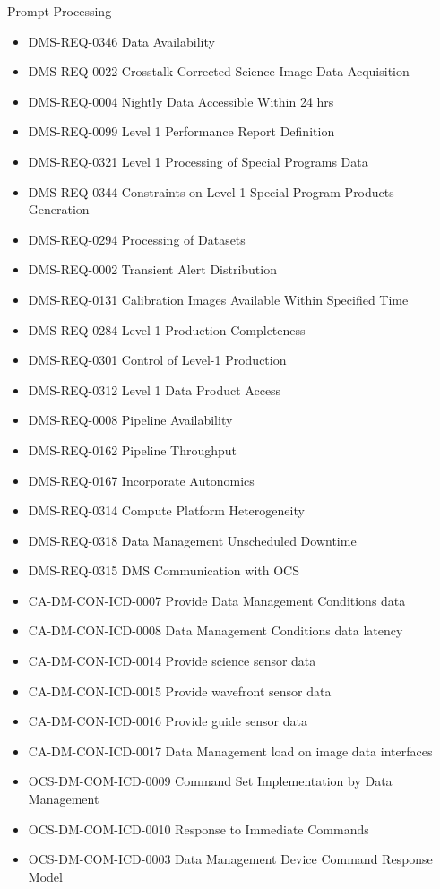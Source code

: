 Prompt Processing \begin{itemize}
\item DMS-REQ-0346 Data Availability
\item DMS-REQ-0022 Crosstalk Corrected Science Image Data Acquisition
\item DMS-REQ-0004 Nightly Data Accessible Within 24 hrs
\item DMS-REQ-0099 Level 1 Performance Report Definition
\item DMS-REQ-0321 Level 1 Processing of Special Programs Data
\item DMS-REQ-0344 Constraints on Level 1 Special Program Products Generation
\item DMS-REQ-0294 Processing of Datasets
\item DMS-REQ-0002 Transient Alert Distribution
\item DMS-REQ-0131 Calibration Images Available Within Specified Time
\item DMS-REQ-0284 Level-1 Production Completeness
\item DMS-REQ-0301 Control of Level-1 Production
\item DMS-REQ-0312 Level 1 Data Product Access
\item DMS-REQ-0008 Pipeline Availability
\item DMS-REQ-0162 Pipeline Throughput
\item DMS-REQ-0167 Incorporate Autonomics
\item DMS-REQ-0314 Compute Platform Heterogeneity
\item DMS-REQ-0318 Data Management Unscheduled Downtime
\item DMS-REQ-0315 DMS Communication with OCS
\item CA-DM-CON-ICD-0007 Provide Data Management Conditions data
\item CA-DM-CON-ICD-0008 Data Management Conditions data latency
\item CA-DM-CON-ICD-0014 Provide science sensor data
\item CA-DM-CON-ICD-0015 Provide wavefront sensor data
\item CA-DM-CON-ICD-0016 Provide guide sensor data
\item CA-DM-CON-ICD-0017 Data Management load on image data interfaces
\item OCS-DM-COM-ICD-0009 Command Set Implementation by Data Management
\item OCS-DM-COM-ICD-0010 Response to Immediate Commands
\item OCS-DM-COM-ICD-0003 Data Management Device Command Response Model

\end{itemize}
